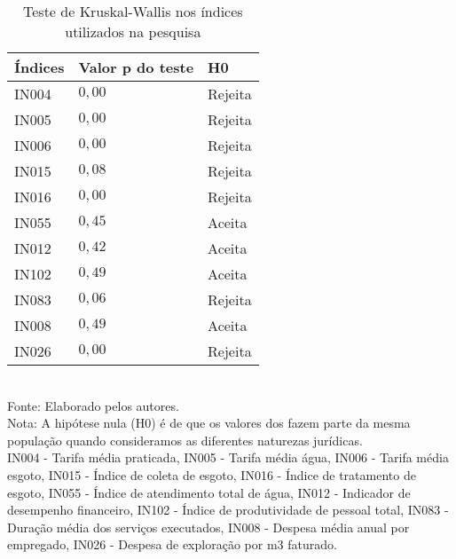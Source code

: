 
\begin{table}[H] \centering 

\begin{minipage}{0.75\textwidth}
  \caption{Teste de Kruskal-Wallis nos índices utilizados na pesquisa} 
  \label{tab:krusk} 

\begin{tabular}{P{3.8cm}P{3.8cm}P{3.8cm}}
\toprule
\toprule
Índices & Valor p  do teste & H0 \\ 

\midrule

IN004 & $0,00$ & Rejeita \\ 
IN005 & $0,00$ & Rejeita \\ 
IN006 & $0,00$ & Rejeita \\ 
\hline
IN015 & $0,08$ & Rejeita \\ 
IN016 & $0,00$ & Rejeita \\ 
IN055 & $0,45$ & Aceita \\ 
\hline
IN012 & $0,42$ & Aceita \\ 
IN102 & $0,49$ & Aceita \\ 
IN083 & $0,06$ & Rejeita \\ 
\hline
IN008 & $0,49$ & Aceita \\ 
IN026 & $0,00$ & Rejeita \\ 

\bottomrule

\end{tabular} 
	\footnotesize \\
		Fonte: Elaborado pelos autores. \\ 
		Nota: A hipótese nula (H0) é de que os valores dos fazem parte da mesma população quando consideramos as diferentes naturezas jurídicas. \\
				IN004 - Tarifa média praticada,
				IN005 - Tarifa média água,
				IN006 - Tarifa média esgoto,		
				IN015 - Índice de coleta de esgoto,
				IN016 - Índice de tratamento de esgoto,
				IN055 - Índice de atendimento total de água,	
				IN012 - Indicador de desempenho financeiro,
				IN102 - Índice de produtividade de pessoal total,
				IN083 - Duração média dos serviços executados,	
				IN008 - Despesa média anual por empregado,
				IN026 - Despesa de exploração por m3 faturado.   	
\end{minipage}
\end{table} 
